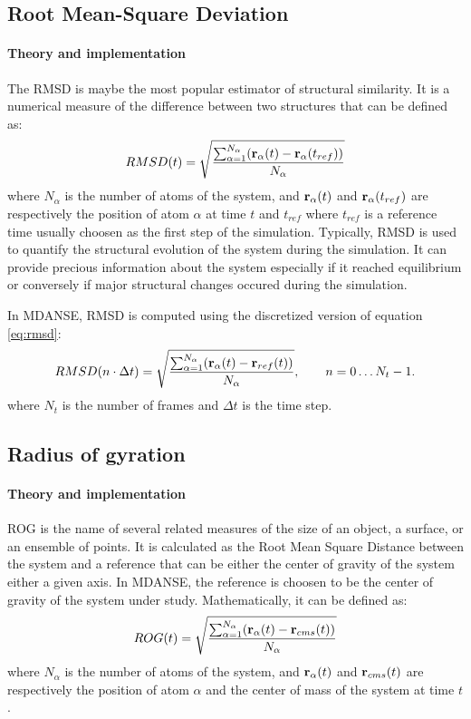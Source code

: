 \documentclass[a4paper,11pt]{article}
\begin{document}
\subsection{Root Mean-Square Deviation}
\label{rmsd}
\paragraph{Theory and implementation\\}
\label{rmsd_theory}
The \gls{RMSD} is maybe the most popular estimator of structural similarity. It is a 
numerical measure of the difference between two structures that can be defined as:
\begin{equation}
\label{eq:rmsd}
RMSD(t) = \sqrt{\frac{\sum_{\alpha = 1}^{N_{\alpha}}({\bf r}_{\alpha}(t) - {\bf r}_{\alpha}(t_{ref}))}{N_{\alpha}}}
\end{equation}
where $N_{\alpha}$ is the number of atoms of the system, and ${\bf r}_{\alpha}(t)$ and ${\bf r}_{\alpha}(t_{ref})$ are 
respectively the position of atom $\alpha$ at time $t$ and $t_{ref}$ where $t_{ref}$ is a reference time usually 
choosen as the first step of the simulation.
Typically, \gls{RMSD} is used to quantify the structural evolution of the system during the simulation. It can 
provide precious information about the system especially if it reached equilibrium or conversely if major
structural changes occured during the simulation.

In \gls{MDANSE}, \gls{RMSD} is computed using the discretized version of equation \ref{eq:rmsd}:
\begin{equation}
\label{eq:rmsd_num}
RMSD(n\cdot\Delta t) = \sqrt{\frac{\sum_{\alpha = 1}^{N_{\alpha}}({\bf r}_{\alpha}(t) - {\bf r}_{ref}(t))}{N_{\alpha}}},
\qquad n = 0\ldots N_t - 1.
\end{equation}
where $N_t$ is the number of frames and $\Delta t$ is the time step.

\subsection{Radius of gyration}
\label{rog}
\paragraph{Theory and implementation\\}
\label{rog_theory}
\gls{ROG} is the name of several related measures of the size of an object, a surface, or an ensemble of 
points. It is calculated as the Root Mean Square Distance between the system and a reference that can be either 
the center of gravity of the system either a given axis. In \gls{MDANSE}, the reference is choosen to be the center 
of gravity of the system under study. Mathematically, it can be defined as:
\begin{equation}
\label{eq:rog}
ROG(t) = \sqrt{\frac{\sum_{\alpha = 1}^{N_{\alpha}}({\bf r}_{\alpha}(t) - {\bf r}_{cms}(t))}{N_{\alpha}}}
\end{equation}
where $N_{\alpha}$ is the number of atoms of the system, and ${\bf r}_{\alpha}(t)$ and ${\bf r}_{cms}(t)$ are 
respectively the position of atom $\alpha$ and the center of mass of the system at time $t$.
\end{document}
